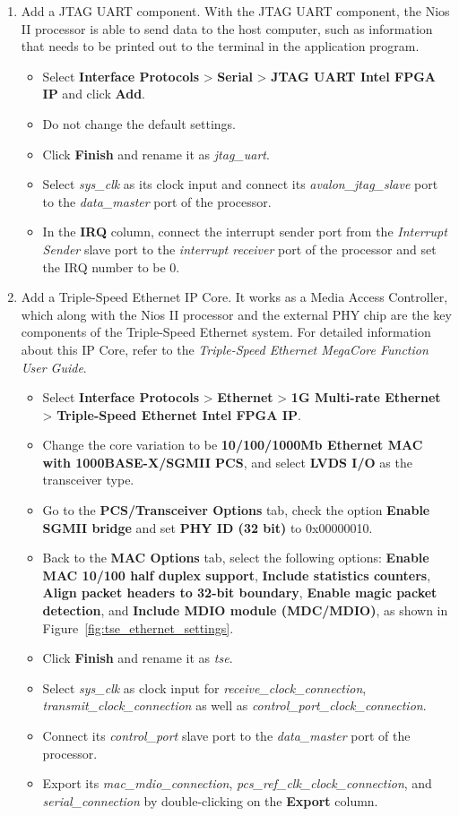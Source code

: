 \documentclass[11pt, twoside, pdftex]{article}
\begin{document}
\begin{enumerate}
	\item Add a JTAG UART component. With the JTAG UART component, the Nios II processor is able to send data to the host computer, such as information that needs to be printed out to the terminal in the application program.
		\begin{itemize}
			\item Select {\bf Interface Protocols} > {\bf Serial} > {\bf JTAG UART Intel FPGA IP} and click {\bf Add}.
			\item Do not change the default settings. 
			\item Click {\bf Finish} and rename it as {\it jtag\_uart}.
			\item Select {\it sys\_clk} as its clock input and connect its {\it avalon\_jtag\_slave} port to the {\it data\_master} port of the processor. 
			\item In the {\bf IRQ} column, connect the interrupt sender port from the {\it Interrupt Sender} slave port to the {\it interrupt receiver} port of the processor and set the IRQ number to be 0.
		\end{itemize}	
	
	\item Add a Triple-Speed Ethernet IP Core. It works as a Media Access Controller, which along with the Nios II processor and the external PHY chip are the key components of the Triple-Speed Ethernet system. For detailed information about this IP Core, refer to the {\it Triple-Speed Ethernet MegaCore Function User Guide}. 
		\begin{itemize}
			\item Select {\bf Interface Protocols} > {\bf Ethernet} > {\bf 1G Multi-rate Ethernet} > {\bf Triple-Speed Ethernet Intel FPGA IP}.
			\item Change the core variation to be {\bf 10/100/1000Mb Ethernet MAC with 1000BASE-X/SGMII PCS}, and select {\bf LVDS I/O} as the transceiver type. 
			\item Go to the {\bf PCS/Transceiver Options} tab, check the option {\bf Enable SGMII bridge} and set {\bf PHY ID (32 bit)} to 0x00000010.
			\item Back to the {\bf MAC Options} tab, select the following options: {\bf Enable MAC 10/100 half duplex support}, {\bf Include statistics counters}, {\bf Align packet headers to 32-bit boundary}, {\bf Enable magic packet detection}, and {\bf Include MDIO module (MDC/MDIO)}, as shown in Figure~\ref{fig:tse_ethernet_settings}. 
			\item Click {\bf Finish} and rename it as {\it tse}.
			\item Select {\it sys\_clk} as clock input for {\it receive\_clock\_connection}, {\it transmit\_clock\_connection} as well as {\it control\_port\_clock\_connection}. 
			\item Connect its {\it control\_port} slave port to the {\it data\_master} port of the processor.
			\item Export its {\it mac\_mdio\_connection}, {\it pcs\_ref\_clk\_clock\_connection}, and {\it serial\_connection} by double-clicking on the {\bf Export} column.
		\end{itemize}
		

\end{enumerate}
\end{document}

